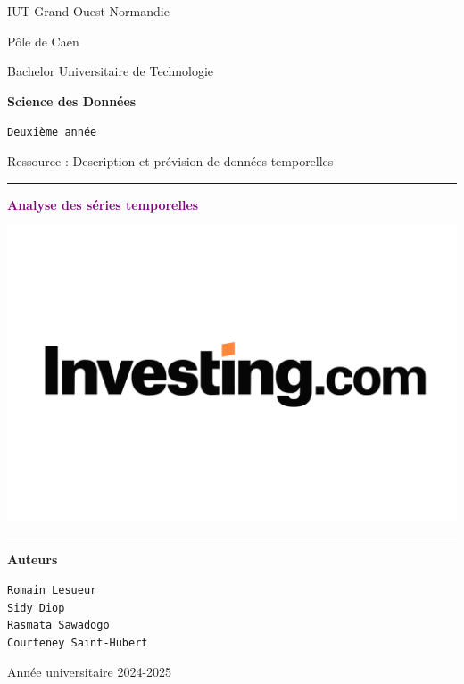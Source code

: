 \documentclass[11pt]{article}
\begin{document}
\begin{center}
{\fontsize{24}{15}\selectfont IUT Grand Ouest Normandie}

\vspace{0.5cm}

{\LARGE Pôle de Caen}

\vspace{1.cm}

{\fontsize{20}{15}\selectfont Bachelor Universitaire de Technologie}

\vspace{0.4cm}

{\fontsize{20}{15}\selectfont \bf Science des Données}

\vspace{1.25cm}

{\Large \tt Deuxième année}

\vspace{0.3cm}

{\Large Ressource : Description et prévision de données temporelles}

\vspace{1cm}

\rule{0.5\textwidth}{1pt}

\vspace{0.8cm}

{\fontsize{20}{15}\selectfont \textcolor{purple}{\bf Analyse des séries temporelles}}

\vspace{1cm}

\includegraphics[scale=0.04]{Images/premier.png}

\vspace{0.3cm}

\rule{0.5\textwidth}{1pt}

\vspace{0.5cm}

{\Large \bf Auteurs}

\vspace{0.1cm}

{\tt Romain Lesueur}\\[0.2cm]
{\tt Sidy Diop}\\[0.2cm]
{\tt Rasmata Sawadogo}\\[0.2cm]
{\tt Courteney Saint-Hubert}

\vspace{1.7cm}

{\large Année universitaire 2024-2025}

\end{center}
\end{document}
